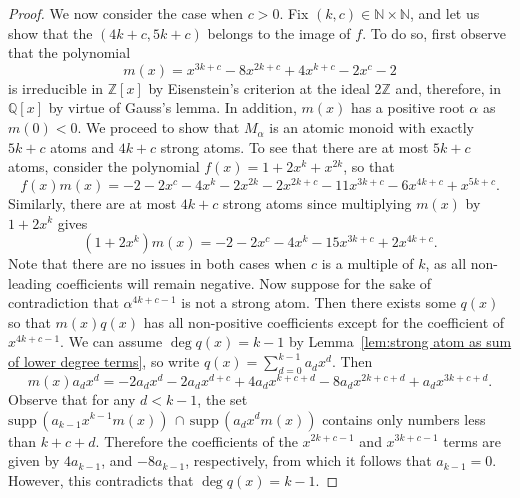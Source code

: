 \documentclass[10pt,a4paper]{amsart}
\newcommand{\N}{\mathbb{N}}
\newcommand{\nn}{\mathbb{N}}
\newcommand{\qq}{\mathbb{Q}}
\newcommand{\supp}{\text{supp}\,}
\newcommand{\zz}{\mathbb{Z}}
\begin{document}
\begin{proof}
    We now consider the case when $c>0$. Fix $(k,c) \in \nn \times \N$, and let us show that the $(4k+c,5k+c)$ belongs to the image of $f$. To do so, first observe that the polynomial
    \[
    	m(x) = x^{3k+c} - 8x^{2k+c} + 4x^{k+c} - 2x^c - 2
    \]
    is irreducible in $\zz[x]$ by Eisenstein's criterion at the ideal $2\zz$ and, therefore, in $\qq[x]$ by virtue of Gauss's lemma. In addition, $m(x)$ has a positive root $\alpha$ as $m(0) < 0$. We proceed to show that $M_\alpha$ is an atomic monoid with exactly $5k+c$ atoms and $4k+c$ strong atoms. To see that there are at most $5k+c$ atoms, consider the polynomial $f(x) = 1 + 2x^k + x^{2k}$, so that
    \[
        f(x)m(x)=-2-2x^c-4x^k-2x^{2k}-2x^{2k+c}-11x^{3k+c}-6x^{4k+c}+x^{5k+c}.
    \]
    Similarly, there are at most $4k+c$ strong atoms since multiplying $m(x)$ by $1+2x^k$ gives
    \[
    	(1+2x^{k}) m(x) = -2-2x^c-4x^k-15x^{3k+c}+2x^{4k+c}.
    \]
    Note that there are no issues in both cases when $c$ is a multiple of $k$, as all non-leading coefficients will remain negative. Now suppose for the sake of contradiction that $\alpha^{4k+c-1}$ is not a strong atom. Then there exists some $q(x)$ so that $m(x)q(x)$ has all non-positive coefficients except for the coefficient of $x^{4k+c-1}$. We can assume $\deg q(x)=k-1$ by Lemma~\ref{lem:strong atom as sum of lower degree terms}, so write $q(x)=\sum_{d=0}^{k-1}a_dx^d$. Then
    \[
    	 m(x) a_dx^d = -2a_dx^d-2a_dx^{d+c}+4a_dx^{k+c+d}-8a_dx^{2k+c+d}+a_dx^{3k+c+d}.
    \]
    Observe that for any $d<k-1$, the set $\supp(a_{k-1}x^{k-1}m(x))\,\cap\,\supp(a_{d}x^{d}m(x))$ contains only numbers less than $k+c+d$. Therefore the coefficients of the $x^{2k+c-1}$ and $x^{3k+c-1}$ terms are given by $4a_{k-1}$, and $-8a_{k-1}$, respectively, from which it follows that $a_{k-1} = 0$. However, this contradicts that $\deg q(x) = k-1$.
    

\end{proof}
\end{document}
